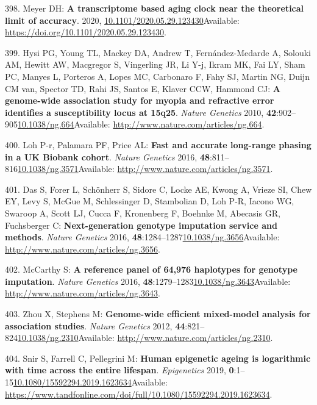 \documentclass[
]{book}
\begin{document}
\leavevmode\hypertarget{ref-Meyer2020}{}%
398. Meyer DH: \textbf{A transcriptome based aging clock near the theoretical limit of accuracy}. 2020, \href{https://doi.org/10.1101/2020.05.29.123430}{10.1101/2020.05.29.123430}Available: \url{https://doi.org/10.1101/2020.05.29.123430}.

\leavevmode\hypertarget{ref-Hysi2010}{}%
399. Hysi PG, Young TL, Mackey DA, Andrew T, Fernández-Medarde A, Solouki AM, Hewitt AW, Macgregor S, Vingerling JR, Li Y-j, Ikram MK, Fai LY, Sham PC, Manyes L, Porteros A, Lopes MC, Carbonaro F, Fahy SJ, Martin NG, Duijn CM van, Spector TD, Rahi JS, Santos E, Klaver CCW, Hammond CJ: \textbf{A genome-wide association study for myopia and refractive error identifies a susceptibility locus at 15q25}. \emph{Nature Genetics} 2010, \textbf{42}:902--905\href{https://doi.org/10.1038/ng.664}{10.1038/ng.664}Available: \url{http://www.nature.com/articles/ng.664}.

\leavevmode\hypertarget{ref-Loh2016}{}%
400. Loh P-r, Palamara PF, Price AL: \textbf{Fast and accurate long-range phasing in a UK Biobank cohort}. \emph{Nature Genetics} 2016, \textbf{48}:811--816\href{https://doi.org/10.1038/ng.3571}{10.1038/ng.3571}Available: \url{http://www.nature.com/articles/ng.3571}.

\leavevmode\hypertarget{ref-Das2016}{}%
401. Das S, Forer L, Schönherr S, Sidore C, Locke AE, Kwong A, Vrieze SI, Chew EY, Levy S, McGue M, Schlessinger D, Stambolian D, Loh P-R, Iacono WG, Swaroop A, Scott LJ, Cucca F, Kronenberg F, Boehnke M, Abecasis GR, Fuchsberger C: \textbf{Next-generation genotype imputation service and methods}. \emph{Nature Genetics} 2016, \textbf{48}:1284--1287\href{https://doi.org/10.1038/ng.3656}{10.1038/ng.3656}Available: \url{http://www.nature.com/articles/ng.3656}.

\leavevmode\hypertarget{ref-McCarthy2017}{}%
402. McCarthy S: \textbf{A reference panel of 64,976 haplotypes for genotype imputation}. \emph{Nature Genetics} 2016, \textbf{48}:1279--1283\href{https://doi.org/10.1038/ng.3643}{10.1038/ng.3643}Available: \url{http://www.nature.com/articles/ng.3643}.

\leavevmode\hypertarget{ref-Zhou2012a}{}%
403. Zhou X, Stephens M: \textbf{Genome-wide efficient mixed-model analysis for association studies}. \emph{Nature Genetics} 2012, \textbf{44}:821--824\href{https://doi.org/10.1038/ng.2310}{10.1038/ng.2310}Available: \url{http://www.nature.com/articles/ng.2310}.

\leavevmode\hypertarget{ref-Snir2019}{}%
404. Snir S, Farrell C, Pellegrini M: \textbf{Human epigenetic ageing is logarithmic with time across the entire lifespan}. \emph{Epigenetics} 2019, \textbf{0}:1--15\href{https://doi.org/10.1080/15592294.2019.1623634}{10.1080/15592294.2019.1623634}Available: \url{https://www.tandfonline.com/doi/full/10.1080/15592294.2019.1623634}.
\end{document}
